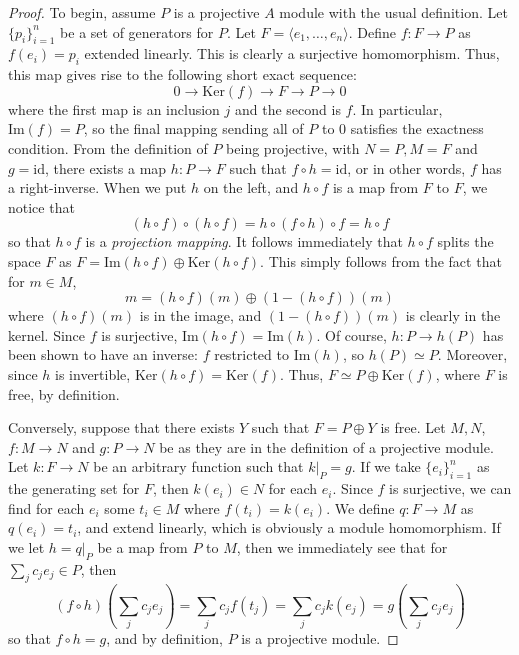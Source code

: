 \documentclass[aps,pra,showpacs,notitlepage,onecolumn,superscriptaddress,nofootinbib]{revtex4-1}
\theoremstyle{definition}
\begin{document}
\begin{proof}
  To begin, assume $P$ is a projective $A$ module with the usual definition. Let $\{p_i\}_{i = 1}^{n}$ be a set of generators for $P$. Let $F = \langle e_1, \dots, e_n \rangle$.
  Define $f : F \rightarrow P$ as $f(e_i) = p_i$ extended linearly. This is clearly a surjective homomorphism. Thus, this map gives rise to the following short exact sequence:
  \begin{equation}
    0 \longrightarrow \text{Ker}(f) \longrightarrow F \longrightarrow P \longrightarrow 0
  \end{equation}
  where the first map is an inclusion $j$ and the second is $f$. In particular, $\text{Im}(f) = P$, so the final mapping sending all of $P$
  to $0$ satisfies the exactness condition. From the definition of $P$ being projective, with $N = P, M = F$ and $g = \text{id}$, there
  exists a map $h : P \rightarrow F$ such that $f \circ h = \text{id}$, or in other words, $f$ has a right-inverse. When we put $h$
  on the left, and $h \circ f$ is a map from $F$ to $F$, we notice that
  \begin{equation}
    (h \circ f) \circ (h \circ f) = h \circ (f \circ h) \circ f = h \circ f
  \end{equation}
  so that $h \circ f$ is a \emph{projection mapping}. It follows immediately that $h \circ f$ splits the space $F$ as $F = \text{Im}(h \circ f) \oplus \text{Ker}(h \circ f)$.
  This simply follows from the fact that for $m \in M$,
  \begin{equation}
    m = (h \circ f)(m) \oplus (1 - (h \circ f))(m)
  \end{equation}
  where $(h \circ f)(m)$ is in the image, and $(1 - (h \circ f))(m)$ is clearly in the kernel. Since $f$ is surjective, $\text{Im}(h \circ f) = \text{Im}(h)$. Of course, $h : P \rightarrow h(P)$
  has been shown to have an inverse: $f$ restricted to $\text{Im}(h)$, so $h(P) \simeq P$. Moreover, since $h$ is invertible, $\text{Ker}(h \circ f) = \text{Ker}(f)$. Thus, $F \simeq P \oplus \text{Ker}(f)$,
  where $F$ is free, by definition.

  Conversely, suppose that there exists $Y$ such that $F = P \oplus Y$ is free. Let $M, N$, $f : M \rightarrow N$ and $g : P \rightarrow N$ be
  as they are in the definition of a projective module. Let $k : F \rightarrow N$ be an arbitrary function such that $k|_P = g$. If
  we take $\{e_i\}_{i = 1}^{n}$ as the generating set for $F$, then $k(e_i) \in N$ for each $e_i$. Since $f$ is surjective, we can
  find for each $e_i$ some $t_i \in M$ where $f(t_i) = k(e_i)$. We define $q : F \rightarrow M$ as $q(e_i) = t_i$, and extend linearly, which is obviously a module homomorphism.
  If we let $h = q|_{P}$ be a map from $P$ to $M$, then we immediately see that for $\sum_{j} c_j e_j \in P$, then
  \begin{equation}
    (f \circ h)\left(\sum_{j} c_j e_j\right) = \sum_{j} c_j f(t_j) = \sum_{j} c_j k(e_j) = g \left( \sum_{j} c_j e_j \right)
  \end{equation}
  so that $f \circ h = g$, and by definition, $P$ is a projective module.
\end{proof}
\end{document}
